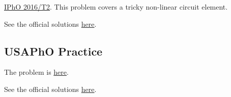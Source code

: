\documentclass[11pt]{scrartcl}
\newcommand{\officialsol}[1]{See the official solutions \href{#1}{here}.}
\begin{document}

\begin{prob}
    \href{https://ipho.olimpicos.net/pdf/IPhO_2016_Q2.pdf}{IPhO 2016/T2}. This problem covers a tricky non-linear circuit element.
\end{prob}
\begin{sol}
    \officialsol{https://ipho.olimpicos.net/pdf/IPhO_2016_S2.pdf}
\end{sol}

\subsection{USAPhO Practice}

\begin{prob}[USAPhO 2016/A2]
    The problem is \href{https://www.aapt.org/physicsteam/2016/upload/E3-2-3.pdf\#page=4}{here}.
\end{prob}
\begin{sol}
\officialsol{https://aapt.org/physicsteam/2016/upload/E3-2-3.pdf\#page=4}
\end{sol}
\end{document}
